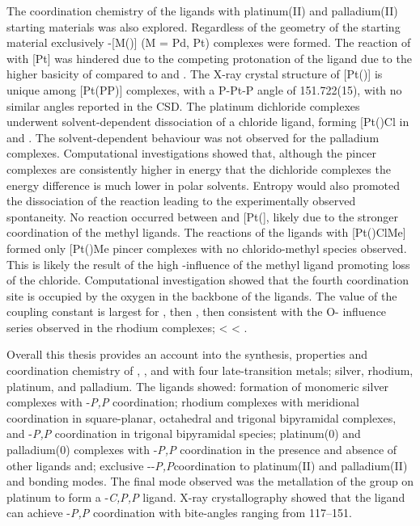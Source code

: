 The coordination chemistry of the \tBuxantphos{} ligands with platinum(II) and palladium(II) starting materials was also explored.  Regardless of the geometry of the starting material exclusively \trans{}-[M(\tBuxantphos)] (M = Pd, Pt) complexes were formed.  The reaction of \tBusixantphos{} with [Pt] was hindered due to the competing protonation of the ligand due to the higher basicity of \tBusixantphos{} compared to \tButhixantphos{} and \tBuxantphos{}.  The X-ray crystal structure of [Pt(\tBuxantphos)] is unique among [Pt(PP)] complexes, with a P-Pt-P angle of 151.722(15)\degrees{}, with no similar angles reported in the \gls{CSD}.  The platinum dichloride complexes underwent solvent-dependent dissociation of a chloride ligand, forming [Pt(\tBuxantphosk)Cl\ce{]+} in  and .  The solvent-dependent behaviour was not observed for the palladium complexes.  Computational investigations showed that, although the pincer complexes are consistently higher in energy that the dichloride complexes the energy difference is much lower in polar solvents.  Entropy would also promoted the dissociation of the reaction leading to the experimentally observed spontaneity.  No reaction occurred between \tButhixantphos{} and [Pt(], likely due to the stronger coordination of the methyl ligands.  The reactions of the \tBuxantphos{} ligands with [Pt()ClMe] formed only [Pt(\tBuxantphos)Me\ce{]+} pincer complexes with no chlorido-methyl species observed.  This is likely the result of the high \trans{}-influence of the methyl ligand promoting loss of the chloride.  Computational investigation showed that the fourth coordination site is occupied by the oxygen in the backbone of the \tBuxantphos{} ligands.  The value of the \JPtC{} coupling constant is largest for \tBusixantphos{}, then \tButhixantphos{}, then \tBuxantphos{} consistent with the O-\trans{} influence series observed in the rhodium complexes; \tBusixantphos{} \textless{} \tButhixantphos{} \textless{} \tBuxantphos.  

Overall this thesis provides an account into the synthesis, properties and coordination chemistry of \tBusixantphos, \tButhixantphos{}, and \tBuxantphos{} with four late-transition metals; silver, rhodium, platinum, and palladium.  The ligands showed: formation of monomeric silver complexes with \dento{}-\emph{P,P}\textprime{} coordination; rhodium complexes with meridional \POP{} coordination in square-planar, octahedral and trigonal bipyramidal complexes, and \dento{}-\emph{P,P}\textprime{} coordination in trigonal bipyramidal species; platinum(0) and palladium(0) complexes with \dento{}-\emph{P,P}\textprime{} coordination in the presence and absence of other ligands and; exclusive \trans{}-\dento{}-\emph{P,P}\textprime{}coordination to platinum(II) and palladium(II) and \POP{} bonding modes.  The final mode observed was the metallation of the \tBu{} group on platinum to form a \dento{}-\emph{C,P,P}\textprime{} ligand.  X-ray crystallography showed that the \tButhixantphos{} ligand can achieve \dento{}-\emph{P,P}\textprime{} coordination with bite-angles ranging from 117--151\degrees{}.  

